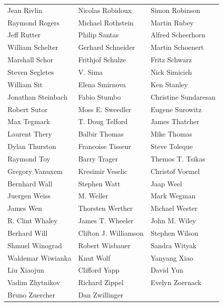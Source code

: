\begin{tabular}{lll}
Jean Rivlin            & Nicolas Robidoux       & Simon Robinson\\
Raymond Rogers         & Michael Rothstein      & Martin Rubey\\
Jeff Rutter            & Philip Santas          & Alfred Scheerhorn\\
William Schelter       & Gerhard Schneider      & Martin Schoenert\\
Marshall Schor         & Frithjof Schulze       & Fritz Schwarz\\
Steven Segletes        & V. Sima                & Nick Simicich\\
William Sit            & Elena Smirnova         & Ken Stanley\\
Jonathan Steinbach     & Fabio Stumbo           & Christine Sundaresan\\
Robert Sutor           & Moss E. Sweedler       & Eugene Surowitz\\
Max Tegmark            & T. Doug Telford        & James Thatcher\\
Laurent Thery          & Balbir Thomas          & Mike Thomas\\
Dylan Thurston         & Francoise Tisseur      & Steve Toleque\\
Raymond Toy            & Barry Trager           & Themos T. Tsikas\\
Gregory Vanuxem        & Kresimir Veselic       & Christof Voemel\\
Bernhard Wall          & Stephen Watt           & Jaap Weel\\
Juergen Weiss          & M. Weller              & Mark Wegman\\
James Wen              & Thorsten Werther       & Michael Wester\\
R. Clint Whaley        & James T. Wheeler       & John M. Wiley\\
Berhard Will           & Clifton J. Williamson  & Stephen Wilson\\
Shmuel Winograd        & Robert Wisbauer        & Sandra Wityak\\
Waldemar Wiwianka      & Knut Wolf              & Yanyang Xiao\\
Liu Xiaojun            & Clifford Yapp          & David Yun\\
Vadim Zhytnikov        & Richard Zippel         & Evelyn Zoernack\\
Bruno Zuercher         & Dan Zwillinger\\
\end{tabular}
\newpage


